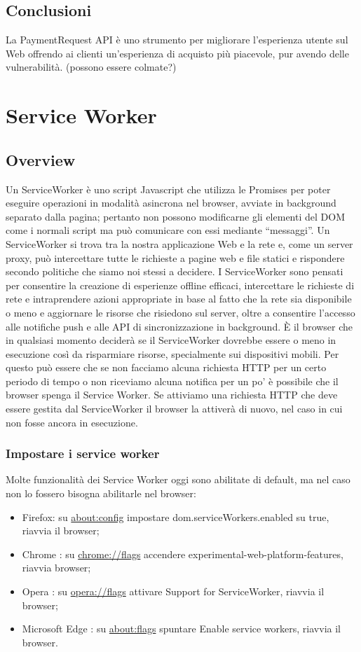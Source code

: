 \documentclass[11pt ,a4paper , twoside , openright ]{article}
\begin{document}
\subsection{Conclusioni}
La PaymentRequest API è uno strumento per migliorare l'esperienza utente sul Web offrendo ai clienti un'esperienza di acquisto più piacevole, pur avendo delle vulnerabilità. (possono essere colmate?)
\newpage
\cleardoublepage
\section{Service Worker}
\subsection{Overview}
Un ServiceWorker è uno script Javascript che utilizza le Promises per poter eseguire operazioni in modalità asincrona nel browser, avviate in background separato dalla pagina; pertanto non possono modificarne gli elementi del DOM come i normali script ma può comunicare con essi mediante “messaggi”.
Un ServiceWorker si trova tra la nostra applicazione Web e la rete e, come un server proxy, può intercettare tutte le richieste a pagine web e file statici e rispondere secondo politiche che siamo noi stessi a decidere.
I ServiceWorker sono pensati per consentire la creazione di esperienze offline efficaci, intercettare le richieste di rete e intraprendere azioni appropriate in base al fatto che la rete sia disponibile o meno e aggiornare le risorse che risiedono sul server, oltre a consentire l'accesso alle notifiche push e alle API di sincronizzazione in background.
È il browser che in qualsiasi momento deciderà se il ServiceWorker dovrebbe essere o meno in esecuzione così da risparmiare risorse, specialmente sui dispositivi mobili. Per questo può essere che se non facciamo alcuna richiesta HTTP per un certo periodo di tempo o non riceviamo alcuna notifica per un po' è possibile che il browser spenga il Service Worker. Se attiviamo una richiesta HTTP che deve essere gestita dal ServiceWorker il browser la attiverà di nuovo, nel caso in cui non fosse ancora in esecuzione. 

\subsubsection{Impostare i service worker}
Molte funzionalità dei Service Worker oggi sono abilitate di default, ma nel caso non lo fossero bisogna abilitarle nel browser:
\begin{itemize}
	\item Firefox: su \url{about:config} impostare dom.serviceWorkers.enabled su true, riavvia il browser;
	\item Chrome : su \url{chrome://flags} accendere  experimental-web-platform-features, riavvia browser;
	\item Opera : su \url{opera://flags} attivare Support for ServiceWorker, riavvia il browser;
	\item Microsoft Edge : su \url{about:flags} spuntare  Enable service workers, riavvia il browser.
\end{itemize}
\end{document}
